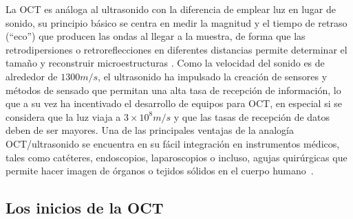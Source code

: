 La OCT es análoga al ultrasonido con la diferencia de emplear luz en lugar de sonido, su principio básico se centra en medir la magnitud y el tiempo de retraso (``eco'') que producen las ondas al llegar a la muestra, de forma que las retrodipersiones o retroreflecciones en diferentes distancias permite determinar el tamaño y reconstruir microestructuras \cite{Szabo}. Como la velocidad del sonido es de alrededor de $1300m/s$, el ultrasonido ha impulsado la creación de sensores y métodos de sensado que permitan una alta tasa de recepción de información, lo que a su vez ha incentivado el desarrollo de equipos para OCT, en especial si se considera que la luz viaja a $3\times 10^8 m/s$ y que las tasas de recepción de datos deben de ser mayores. Una de las principales ventajas de la analogía OCT/ultrasonido se encuentra en su fácil integración en instrumentos médicos, tales como catéteres, endoscopios, laparoscopios o incluso, agujas quirúrgicas que permite hacer imagen de órganos o tejidos sólidos \invivo en el cuerpo humano~\cite{Tearney1996, Tearney1997_2}.


\subsection{Los inicios de la OCT}


